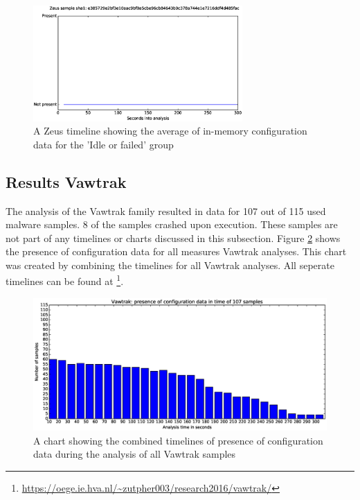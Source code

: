 \documentclass[conference]{IEEEtran}
\begin{document}
\begin{figure}[!h]
    \includegraphics[width=8cm,scale=0.5]{images/zeus/zeus-timelines-eps/Zeus-e385729e2bf3e10aac9bf0a5cbe96cb84643b0c378a744e1e7216ddf4d485fac.eps}
    \caption{A Zeus timeline showing the average of in-memory configuration data for the 'Idle or failed' group}
    \label{fig:zeus-timeline-idle}
\end{figure}

\newpage

\subsection{Results Vawtrak}
The analysis of the Vawtrak family resulted in data for 107 out of 115 used malware samples. 8 of the samples crashed upon execution. These samples are not part of any timelines or charts discussed in this subsection. Figure \ref{fig:vawtrak-bar} shows the presence of configuration data for all measures Vawtrak analyses. This chart was created by combining the timelines for all Vawtrak analyses. All seperate timelines can be found at \footnote{\url{https://oege.ie.hva.nl/~zutpher003/research2016/vawtrak/}}.


\begin{figure}[h]
	\hspace{-3cm}
    \includegraphics[width=13cm,trim=-70mm 0mm 0mm 9mm, clip=true]{images/vawtrak/Vawtrak-barchart.eps}
    \caption{A chart showing the combined timelines of presence of configuration data during the analysis of all Vawtrak samples}
    \label{fig:vawtrak-bar}
\end{figure}
\end{document}
